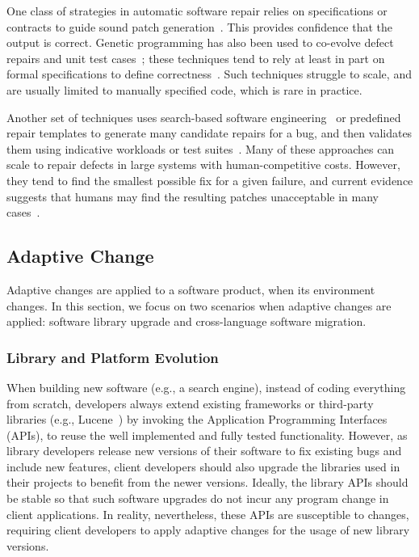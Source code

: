 \documentclass[runningheads,a4paper]{llncs}
\begin{document}
One class of strategies in automatic software repair relies on specifications or contracts to guide sound patch generation~\cite{gopinath2011, liblit2011, liu2012, semfix13, zeller2010}. This provides confidence that the output is correct.  Genetic programming has also been used to co-evolve defect repairs and unit test cases~\cite{Arcuri11,wilkerson2012}; these techniques tend to rely at least in part on formal specifications to define correctness~\cite{arcuriy08,wilkerson11}.  Such techniques struggle to scale, and are usually limited to manually specified code, which is rare in practice.

Another set of techniques uses search-based software engineering~\cite{harman07} or predefined repair templates to generate many candidate repairs for a bug, and then validates them using indicative workloads or test suites~\cite{Kim2013:PAR, genprog-icse2012, Perkins09:clearview}.  Many of these approaches can scale to repair defects in large systems with human-competitive costs.  However, they tend to find the smallest possible fix for a given failure, and current evidence suggests that humans may find the resulting patches unacceptable in many cases~\cite{genprog-maintainability,Kim2013:PAR}. 

\subsection{Adaptive Change}
\label{sec:adaptive}

Adaptive changes are applied to a software product, when its environment changes. In this section, we focus on two scenarios when adaptive changes are applied: software library upgrade and cross-language software migration.


\subsubsection{Library and Platform Evolution} 
When building new software (e.g., a search engine), instead of coding everything from scratch, developers always extend existing frameworks or third-party libraries (e.g., Lucene~\cite{lucene}) by invoking the Application Programming Interfaces (APIs), to reuse the well implemented and fully tested functionality. However, as library developers release new versions of their software to fix existing bugs and include new features, client developers should also upgrade the libraries used in their projects to benefit from the newer versions. Ideally, the library APIs should be stable so that such software upgrades do not incur any program change in client applications. In reality, nevertheless, these APIs are susceptible to changes, requiring client developers to apply adaptive changes for the usage of new library versions. 
\end{document}
